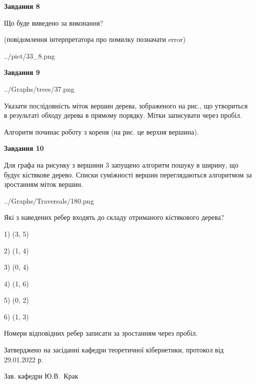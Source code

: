 \documentclass[12pt, ukrainian]{article}
\begin{document}
{\begin {large}
{\begin {center}\textbf{Завдання 8}\end {center}}\par
Що буде виведено за виконання?\par
 (повідомлення інтерпретатора про помилку позначати error)\par
\begin{center}
	{../pict/33_8.png}
\end{center}
\newpage

{\begin {center}\textbf{Завдання 9}\end {center}}\par

\begin{center}
	{../Graphs/trees/37.png}
\end{center}
Указати послідовність міток вершин дерева, зображеного на рис., що утвориться в результаті обходу дерева в прямому порядку. Мітки записувати через пробіл.\par Алгоритм починає роботу з кореня (на рис. це верхня вершина).\par
\newpage

{\begin {center}\textbf{Завдання 10}\end {center}}\par
Для графа на рисунку з вершини 3 запущено алгоритм пошуку в ширину, що будує кістякове дерево. Списки суміжності вершин переглядаються алгоритмом за зростанням міток вершин.\par
\begin{center}
	{../Graphs/Traversals/180.png}
\end{center}
\par Які з наведених ребер входять до складу отриманого кістякового дерева?\par
1) (3, 5)\par
2) (1, 4)\par
3) (0, 4)\par
4) (1, 6)\par
5) (0, 2)\par
6) (1, 3)\par
{\vskip 15pt} Номери відповідних ребер записати за зростанням через пробіл.\par
\newpage


\end {large}
}
{\smallskip \begin {small} Затверджено на засіданні кафедри теоретичної кібернетики, протокол  від   29.01.2022 р.\par\smallskip\smallskip
{\parbox {6.5 cm}{Зав. кафедри \dotfill Ю.В.~Крак}} \end{small}}
\end{document}

